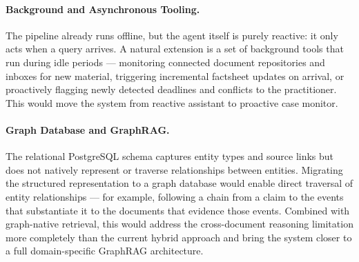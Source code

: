 \paragraph{Background and Asynchronous Tooling.}
The pipeline already runs offline, but the agent itself is purely reactive: it only acts when a query arrives. A natural extension is a set of background tools that run during idle periods --- monitoring connected document repositories and inboxes for new material, triggering incremental factsheet updates on arrival, or proactively flagging newly detected deadlines and conflicts to the practitioner. This would move the system from reactive assistant to proactive case monitor.

\paragraph{Graph Database and GraphRAG.}
The relational PostgreSQL schema captures entity types and source links but does not natively represent or traverse relationships between entities. Migrating the structured representation to a graph database would enable direct traversal of entity relationships --- for example, following a chain from a claim to the events that substantiate it to the documents that evidence those events. Combined with graph-native retrieval, this would address the cross-document reasoning limitation more completely than the current hybrid approach and bring the system closer to a full domain-specific GraphRAG architecture.
